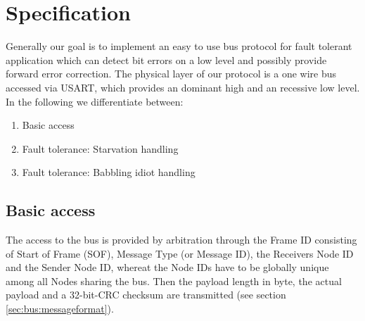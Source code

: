 \section{Specification}
\label{sec:bus:specification}
Generally our goal is to implement an easy to use bus protocol for fault tolerant application which can 
detect bit errors on a low level and possibly provide forward error correction.
The physical layer of our protocol is a one wire bus accessed via USART, which provides an dominant 
high and an recessive low level.
In the following we differentiate between: 
\begin{enumerate}
 \item Basic access
 \item Fault tolerance: Starvation handling
 \item Fault tolerance: Babbling idiot handling
\end{enumerate}

\subsection{Basic access}
\label{sec:bus:basicaccess}
The access to the bus is provided by arbitration through the Frame ID consisting of Start of Frame (SOF), 
Message Type (or Message ID), the Receivers Node ID and the Sender Node ID, whereat the Node IDs have to 
be globally unique among all Nodes sharing the bus.
Then the payload length in byte, the actual payload and a 32-bit-CRC checksum are transmitted (see section \ref{sec:bus:messageformat}).\\

